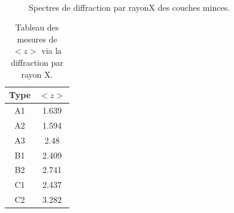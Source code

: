 \documentclass[a4paper,12pt,oneside]{article}
\begin{document}
\begin{figure}[!ht]
{	}\\
	 \hfill
	\caption{Spectres de diffraction par rayonX des couches minces.}
	\label{fig:diff_main}
\end{figure}


\begin{table}[ht]
\centering
   \begin{tabular}{|c|c|}
	  \hline
      Type & $<z>$\\
      \hline
      A1 & 1.639 \\
      A2 & 1.594 \\
      A3 & 2.48 \\
      B1 & 2.409 \\
      B2 & 2.741 \\
      C1 & 2.437 \\
      C2 & 3.282 \\
      \hline
   \end{tabular}
   \caption{Tableau des mesures de $<z>$ via la diffraction par rayon X.}\label{tab:X}
\end{table}









\end{document}
